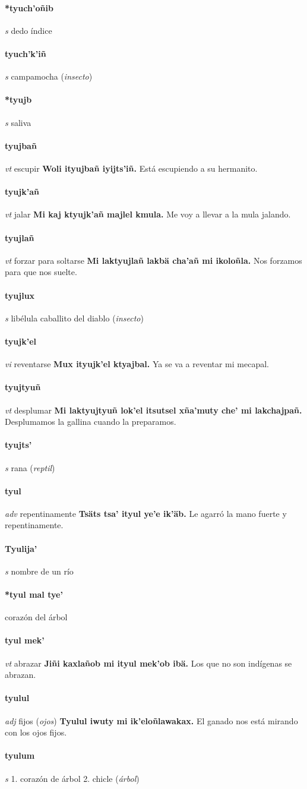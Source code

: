 \documentclass{scrbook}
\newcommand{\entry}[1]{\paragraph{#1}}
\newcommand{\onedefinition}[1]{#1.}
\newcommand{\partofspeech}[1]{\textit{#1}}
\newcommand{\spanishtranslation}[1]{#1}
\newcommand{\clarification}[1]{(\textit{#1})}
\newcommand{\cholexample}[1]{\textbf{#1}}
\newcommand{\exampletranslation}[1]{#1}
\begin{document}
\begin{multicols}{2}
\entry{*tyuch'oñib}
\partofspeech{s}
\spanishtranslation{dedo índice}

\entry{tyuch'k'iñ}
\partofspeech{s}
\spanishtranslation{campamocha}
\clarification{insecto}

\entry{*tyujb}
\partofspeech{s}
\spanishtranslation{saliva}

\entry{tyujbañ}
\partofspeech{vt}
\spanishtranslation{escupir}
\cholexample{Woli ityujbañ iyijts'iñ.}
\exampletranslation{Está escupiendo a su hermanito.}

\entry{tyujk'añ}
\partofspeech{vt}
\spanishtranslation{jalar}
\cholexample{Mi kaj ktyujk'añ majlel kmula.}
\exampletranslation{Me voy a llevar a la mula jalando.}

\entry{tyujlañ}
\partofspeech{vt}
\spanishtranslation{forzar para soltarse}
\cholexample{Mi laktyujlañ lakbä cha'añ mi ikoloñla.}
\exampletranslation{Nos forzamos para que nos suelte.}

\entry{tyujlux}
\partofspeech{s}
\spanishtranslation{libélula}
\spanishtranslation{caballito del diablo}
\clarification{insecto}

\entry{tyujk'el}
\partofspeech{vi}
\spanishtranslation{reventarse}
\cholexample{Mux ityujk'el ktyajbal.}
\exampletranslation{Ya se va a reventar mi mecapal.}

\entry{tyujtyuñ}
\partofspeech{vt}
\spanishtranslation{desplumar}
\cholexample{Mi laktyujtyuñ lok'el itsutsel xña'muty che' mi lakchajpañ.}
\exampletranslation{Desplumamos la gallina cuando la preparamos.}

\entry{tyujts'}
\partofspeech{s}
\spanishtranslation{rana}
\clarification{reptil}

\entry{tyul}
\partofspeech{adv}
\spanishtranslation{repentinamente}
\cholexample{Tsäts tsa' ityul ye'e ik'äb.}
\exampletranslation{Le agarró la mano fuerte y repentinamente.}

\entry{Tyulija'}
\partofspeech{s}
\spanishtranslation{nombre de un río}

\entry{*tyul mal tye'}
\spanishtranslation{corazón del árbol}

\entry{tyul mek'}
\partofspeech{vt}
\spanishtranslation{abrazar}
\cholexample{Jiñi kaxlañob mi ityul mek'ob ibä.}
\exampletranslation{Los que no son indígenas se abrazan.}

\entry{tyulul}
\partofspeech{adj}
\spanishtranslation{fijos}
\clarification{ojos}
\cholexample{Tyulul iwuty mi ik'eloñlawakax.}
\exampletranslation{El ganado nos está mirando con los ojos fijos.}

\entry{tyulum}
\partofspeech{s}
\onedefinition{1}
\spanishtranslation{corazón de árbol}
\onedefinition{2}
\spanishtranslation{chicle}
\clarification{árbol}


\end{multicols}
\end{document}
